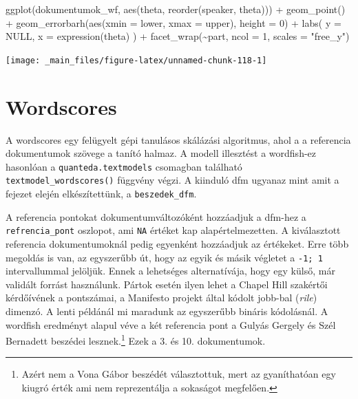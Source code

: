 \documentclass[
]{book}
\newenvironment{Shaded}{\begin{snugshade}}{\end{snugshade}}
\newcommand{\AttributeTok}[1]{\textcolor[rgb]{0.77,0.63,0.00}{#1}}
\newcommand{\ConstantTok}[1]{\textcolor[rgb]{0.00,0.00,0.00}{#1}}
\newcommand{\DecValTok}[1]{\textcolor[rgb]{0.00,0.00,0.81}{#1}}
\newcommand{\FunctionTok}[1]{\textcolor[rgb]{0.00,0.00,0.00}{#1}}
\newcommand{\NormalTok}[1]{#1}
\newcommand{\SpecialCharTok}[1]{\textcolor[rgb]{0.00,0.00,0.00}{#1}}
\newcommand{\StringTok}[1]{\textcolor[rgb]{0.31,0.60,0.02}{#1}}
\begin{document}
\begin{Shaded}
\begin{Highlighting}[]
\FunctionTok{ggplot}\NormalTok{(dokumentumok\_wf, }\FunctionTok{aes}\NormalTok{(theta, }\FunctionTok{reorder}\NormalTok{(speaker, theta))) }\SpecialCharTok{+}
  \FunctionTok{geom\_point}\NormalTok{() }\SpecialCharTok{+}
  \FunctionTok{geom\_errorbarh}\NormalTok{(}\FunctionTok{aes}\NormalTok{(}\AttributeTok{xmin =}\NormalTok{ lower, }\AttributeTok{xmax =}\NormalTok{ upper), }\AttributeTok{height =} \DecValTok{0}\NormalTok{) }\SpecialCharTok{+}
  \FunctionTok{labs}\NormalTok{(}
    \AttributeTok{y =} \ConstantTok{NULL}\NormalTok{,}
    \AttributeTok{x =} \FunctionTok{expression}\NormalTok{(theta)}
\NormalTok{  ) }\SpecialCharTok{+}
  \FunctionTok{facet\_wrap}\NormalTok{(}\SpecialCharTok{\textasciitilde{}}\NormalTok{part, }\AttributeTok{ncol =} \DecValTok{1}\NormalTok{, }\AttributeTok{scales =} \StringTok{"free\_y"}\NormalTok{)}
\end{Highlighting}
\end{Shaded}

\begin{center}\texttt{[image: \_main\_files/figure-latex/unnamed-chunk-118-1]} \end{center}

\hypertarget{wordscores}{%
\section{Wordscores}\label{wordscores}}

A wordscores egy felügyelt gépi tanulásos skálázási algoritmus, ahol a a
referencia dokumentumok szövege a tanító halmaz. A modell illesztést a
wordfish-ez hasonlóan a \texttt{quanteda.textmodels} csomagban található
\texttt{textmodel\_wordscores()} függvény végzi. A kiinduló dfm ugyanaz
mint amit a fejezet elején elkészítettünk, a \texttt{beszedek\_dfm}.

A referencia pontokat dokumentumváltozóként hozzáadjuk a dfm-hez a
\texttt{refrencia\_pont} oszlopot, ami \texttt{NA} értéket kap
alapértelmezetten. A kiválasztott referencia dokumentumoknál pedig
egyenként hozzáadjuk az értékeket. Erre több megoldás is van, az
egyszerűbb út, hogy az egyik és másik végletet a \texttt{-1;\ 1}
intervallummal jelöljük. Ennek a lehetséges alternatívája, hogy egy
külső, már validált forrást használunk. Pártok esetén ilyen lehet a
Chapel Hill szakértői kérdőívének a pontszámai, a Manifesto projekt
által kódolt jobb-bal (\emph{rile}) dimenzó. A lenti példánál mi
maradunk az egyszerűbb bináris kódolásnál. A wordfish eredményt alapul
véve a két referencia pont a Gulyás Gergely és Szél Bernadett beszédei
lesznek.\footnote{Azért nem a Vona Gábor beszédét választottuk, mert az
  gyaníthatóan egy kiugró érték ami nem reprezentálja a sokaságot
  megfelően.} Ezek a 3. és 10. dokumentumok.
\end{document}
